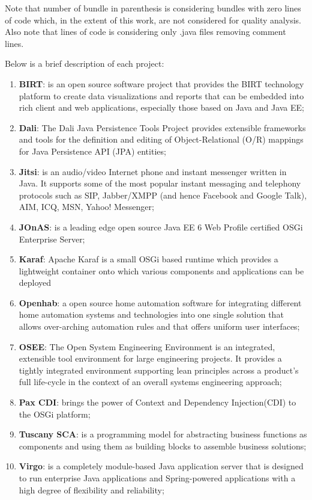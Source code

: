 Note that number of bundle in parenthesis is considering bundles with zero lines of code which, in the extent of this work, are not considered for quality analysis. Also note that lines of code is considering only .java files removing comment lines.

Below is a brief description of each project:

\begin{enumerate}
\item \textbf{BIRT}: is an open source software project that provides the BIRT technology platform to create data visualizations and reports that can be embedded into rich client and web applications, especially those based on Java and Java EE;
\item \textbf{Dali}: The Dali Java Persistence Tools Project provides extensible frameworks and tools for the definition and editing of Object-Relational (O/R) mappings for Java Persistence API (JPA) entities;
\item \textbf{Jitsi}: is an audio/video Internet phone and instant messenger written in Java. It supports some of the most popular instant messaging and telephony protocols such as SIP, Jabber/XMPP (and hence Facebook and Google Talk), AIM, ICQ, MSN, Yahoo! Messenger;
\item \textbf{JOnAS}: is a leading edge open source Java EE 6 Web Profile certified OSGi Enterprise Server;
\item \textbf{Karaf}: Apache Karaf is a small OSGi based runtime which provides a lightweight container onto which various components and applications can be deployed
\item \textbf{Openhab}: a open source home automation software for integrating different home automation systems and technologies into one single solution that allows over-arching automation rules and that offers uniform user interfaces;
\item \textbf{OSEE}: The Open System Engineering Environment is an integrated, extensible tool environment for large engineering projects. It provides a tightly integrated environment supporting lean principles across a product's full life-cycle in the context of an overall systems engineering approach;
\item \textbf{Pax CDI}: brings the power of Context and Dependency Injection(CDI) to the OSGi platform; 
\item \textbf{Tuscany SCA}: is a programming model for abstracting business functions as components and using them as building blocks to assemble business solutions; 
\item \textbf{Virgo}: is a completely module-based Java application server that is designed to run enterprise Java applications and Spring-powered applications with a high degree of flexibility and reliability; 
\end{enumerate}


